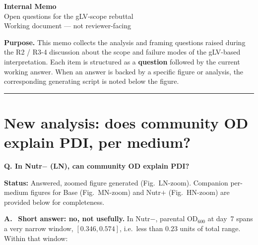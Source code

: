 \documentclass[11pt]{article}
\newcommand{\question}[1]{%
    \par\vspace{0.4em}\noindent%
    {\color{blue!70!black}\textbf{Q. #1}}\par\smallskip%
}
\newcommand{\answerlabel}{\par\noindent\textbf{A.}\ }
\newcommand{\statusmark}[1]{{\color{red!70!black}\textbf{Status:} #1}\par}
\begin{document}
\begin{center}
    {\Large \textbf{Internal Memo}}\\[0.4em]
    {\large Open questions for the gLV-scope rebuttal}\\[0.6em]
    {\small Working document — not reviewer-facing}
\end{center}

\noindent\textbf{Purpose.} This memo collects the analysis and framing questions raised during the R2 / R3-4 discussion about the scope and failure modes of the gLV-based interpretation. Each item is structured as a \textbf{question} followed by the current working answer. When an answer is backed by a specific figure or analysis, the corresponding generating script is noted below the figure.

\tableofcontents
\vspace{1em}
\hrule
\vspace{1em}

\section{New analysis: does community OD explain PDI, per medium?}
\label{sec:q1_LN_OD_PDI}

\question{In Nutr$-$ (LN), can community OD explain PDI?}
\statusmark{Answered, zoomed figure generated (Fig.~LN-zoom). Companion per-medium figures for Base (Fig.~MN-zoom) and Nutr$+$ (Fig.~HN-zoom) are provided below for completeness.}

\answerlabel
\textbf{Short answer: no, not usefully.} In Nutr$-$, parental OD$_{600}$ at day~7 spans a very narrow window, $[0.346, 0.574]$, i.e.\ less than $0.23$ units of total range. Within that window:
\end{document}
